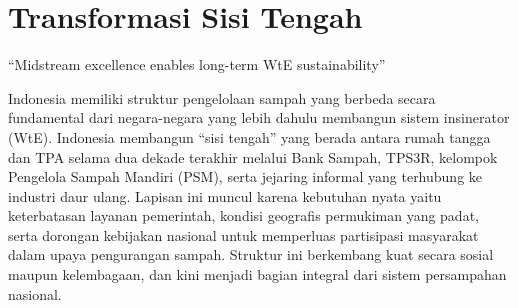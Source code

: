 \documentclass[
  letterpaper,
  DIV=11,
  numbers=noendperiod]{scrreprt}
\begin{document}

\chapter{Transformasi Sisi Tengah}\label{transformasi-sisi-tengah}

``Midstream excellence enables long-term WtE sustainability''

Indonesia memiliki struktur pengelolaan sampah yang berbeda secara
fundamental dari negara-negara yang lebih dahulu membangun sistem
insinerator (WtE). Indonesia membangun ``sisi tengah'' yang berada
antara rumah tangga dan TPA selama dua dekade terakhir melalui Bank
Sampah, TPS3R, kelompok Pengelola Sampah Mandiri (PSM), serta jejaring
informal yang terhubung ke industri daur ulang. Lapisan ini muncul
karena kebutuhan nyata yaitu keterbatasan layanan pemerintah, kondisi
geografis permukiman yang padat, serta dorongan kebijakan nasional untuk
memperluas partisipasi masyarakat dalam upaya pengurangan sampah.
Struktur ini berkembang kuat secara sosial maupun kelembagaan, dan kini
menjadi bagian integral dari sistem persampahan nasional.
\end{document}
